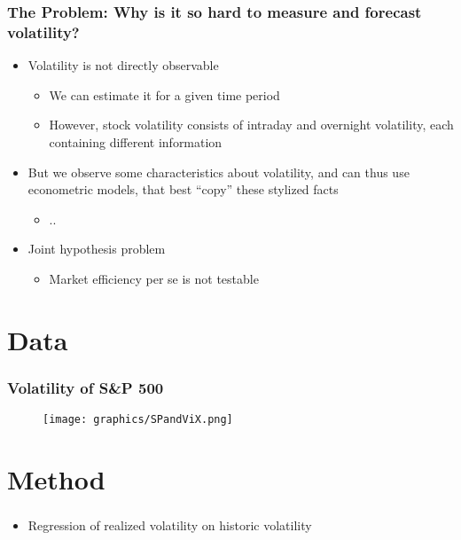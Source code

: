 \documentclass[aspectratio=169]{beamer}
\begin{document}
\begin{frame}
\frametitle{The Problem: Why is it so hard to measure and forecast volatility?}
	\begin{itemize}
	\item<1-> Volatility is not directly observable
	\begin{itemize}
	\item<1-> We can estimate it for a given time period 
	\item<1-> However, stock volatility consists of intraday and overnight volatility, each containing different information
	\end{itemize}
	\item<2-> But we observe some characteristics about volatility, and can thus use econometric models, that best ``copy'' these stylized facts
	\begin{itemize}
	\item<2-> ..
	\end{itemize}
	\item<3-> Joint hypothesis problem
	\begin{itemize}
	\item<3-> Market efficiency per se is not testable
	\end{itemize}
	\end{itemize}
\end{frame}

\section{Data}

\begin{frame}
\frametitle{Volatility of S\&P 500}
	\begin{figure}
	\centering
	\texttt{[image: graphics/SPandViX.png]}
	\end{figure}
\end{frame}


\section{Method}

\begin{frame}
\frametitle{}
	\begin{itemize}
	\item Regression of realized volatility on historic volatility
	\end{itemize}
\end{frame}
\end{document}
